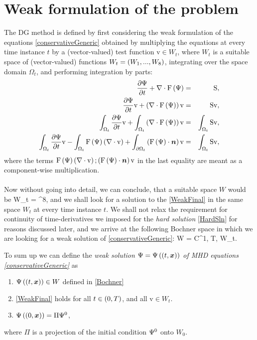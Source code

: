 \section{Weak formulation of the problem}
The DG method is defined by first considering the weak formulation of the equations \ref{conservativeGeneric} obtained by multiplying the equations at every time instance $t$ by a (vector-valued) test function $\mathrm{v}\in W_t$, where $W_t$ is a suitable space of (vector-valued) functions $W_t = \left( W_1, ..., W_8\right)$, integrating over the space domain $\Omega_{t}$, and performing integration by parts:
\begin{eqnarray}
\frac{\partial{\mathrm{\Psi}}}{\partial{t}} + \nabla \cdot \mathrm{F}\left(\mathrm{\Psi}\right) & = &\mathrm{S},\\
\frac{\partial{\mathrm{\Psi}}}{\partial{t}} \mathrm{v} + \left(\nabla \cdot \mathrm{F}\left(\mathrm{\Psi}\right)\right) \mathrm{v} & = &\mathrm{S} \mathrm{v},\\
\int_{\Omega_{t}} \frac{\partial{\mathrm{\Psi}}}{\partial{t}} \mathrm{v} + \int_{\Omega_{t}} \left(\nabla \cdot \mathrm{F}\left(\mathrm{\Psi}\right)\right) \mathrm{v} & = & \int_{\Omega_{t}} \mathrm{S} \mathrm{v},\\
\label{WeakFinal} \int_{\Omega_{t}} \frac{\partial{\mathrm{\Psi}}}{\partial{t}} \mathrm{v} - \int_{\Omega_{t}}\mathrm{F}\left(\mathrm{\Psi}\right) \left(\nabla \cdot \mathrm{v}\right) + \int_{\partial\Omega_{t}} \left(\mathrm{F}\left(\mathrm{\Psi}\right) \cdot \mbox{\boldmath $n$} \right)\mathrm{v} & = & \int_{\Omega_{t}} \mathrm{S} \mathrm{v},
\end{eqnarray}
where the terms $\mathrm{F}\left(\mathrm{\Psi}\right) \left(\nabla \cdot \mathrm{v}\right); \left(\mathrm{F}\left(\mathrm{\Psi}\right) \cdot \mbox{\boldmath $n$} \right)\mathrm{v}$ in the last equality are meant as a component-wise multiplication.
\paragraph{}
Now without going into detail, we can conclude, that a suitable space $W$ would be
\be
\label{Sobolev} W_t = ^8,
\ee
and we shall look for a solution to the \ref{WeakFinal} in the same space $W_t$ at every time instance $t$. We shall not relax the requirement for continuity of time-derivatives we imposed for the \textit{hard solution} \ref{HardSln} for reasons discussed later, and we arrive at the following Bochner space in which we are looking for a weak solution of \ref{conservativeGeneric}:
\be
\label{Bochner} W = C^{1}\lo{}, T\ro, W_t\ro.
\ee

To sum up we can define the \textit{weak solution $\mathrm{\Psi} = \mathrm{\Psi}\left((t, \mbox{\boldmath $x$}\right))$ of MHD equations \ref{conservativeGeneric}} as
\begin{enumerate}
    \label{weakSlnDef}
    \item $\mathrm{\Psi}\left((t, \mbox{\boldmath $x$}\right)) \in W$ defined in \ref{Bochner}
    \item \ref{WeakFinal} holds for all $t\in\left(0, T\right)$, and all $\mathrm{v}\in W_t$.
    \item $\mathrm{\Psi}\left((0, \mbox{\boldmath $x$}\right)) = \Pi \mathrm{\Psi}^0$,
\end{enumerate}
where $\Pi$ is a projection of the initial condition $\mathrm{\Psi}^0$ onto $W_0$.